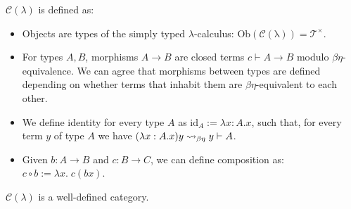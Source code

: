 \begin{definition}
  $\mathcal{C}(\lambda)$ is defined as:
  \begin{itemize}
  \item Objects are types of the simply typed $\lambda$-calculus: $\mathrm{Ob(\mathcal{C}(\lambda))} = \mathcal{T}^\times$.
  \item For types $A,B$, morphisms $A\to B$ are closed terms $c \vdash A\to B$ modulo $\beta\eta$-equivalence. We can agree that morphisms between types are defined depending on whether terms that inhabit them are $\beta\eta$-equivalent to each other.
  \item We define identity for every type $A$ as $\mathrm{id}_A := \lambda x : A . x$, such that, for every term $y$ of type $A$ we have $(\lambda x : A. x) y \mathrel{\leadsto}_{\beta\eta} y \vdash A$.
  \item Given $b:A\to B$ and $c:B\to C$, we can define composition as:
    \(
    c\circ b := \lambda x.\; c(bx)
    \).
  \end{itemize}
\end{definition}

\begin{proposition}
  \label{prop:clambdaiscat}
  $\mathcal{C}(\lambda)$ is a well-defined category.
\end{proposition}

